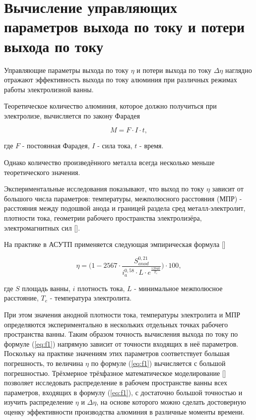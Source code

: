 \documentclass[pdflatex,sn-mathphys-gost]{pmi-jnl}
\begin{document}
\section{Вычисление управляющих параметров выхода по току и потери выхода по току}

Управляющие параметры выхода по току $\eta$ и потери выхода по току $\Delta \eta$ наглядно отражают эффективность выхода по току алюминия при различных режимах работы электролизной ванны.

Теоретическое количество алюминия, которое должно получиться при электролизе, вычисляется по закону Фарадея

\begin{equation}\label{eq:farad}
	M = F \cdot I \cdot t,
\end{equation}

где $F$ - постоянная Фарадея, $I$ - сила тока, $t$ - время.

Однако количество произведённого металла всегда несколько меньше теоретического значения.

Экспериментальные исследования показывают, что выход по току $\eta$ зависит от большого числа параметров: температуры, межполюсного расстояния (МПР) - расстояния между подошвой анода и границей раздела сред металл-электролит, плотности тока, геометрии рабочего пространства электролизёра, электромагнитных сил [\cite{litlink:belo}].

На практике в АСУТП применяется следующая эмпирическая формула [\cite{litlink:VAMI}]

\begin{equation}\label{eq:f1}
	\eta = \bigg(1-2567 \cdot \frac{S^{0,21}_{anod}}{i^{0,58}_{a}\cdot L \cdot e^{\frac{12940}{T_e}}}\bigg) \cdot 100,
\end{equation}

где $S$ площадь ванны, $i$ плотность тока, $L$ - минимальное межполюсное расстояние, $T_e$ - температура электролита.

При этом значения анодной плотности тока, температуры электролита и МПР определяются экспериментально в нескольких отдельных точках рабочего пространства ванны.
Таким образом точность вычисления выхода по току по формуле (\ref{eq:f1}) напрямую зависит от точности входящих в неё параметров. Поскольку на практике значениям этих параметров соответствует большая погрешность, то величина $\eta$ по формуле (\ref{eq:f1}) вычисляется с большой погрешностью. Трёхмерное трёхфазное математическое моделирование [\cite{litlink:kalmykov}] позволяет исследовать распределение в рабочем пространстве ванны всех параметров, входящих в формулу (\ref{eq:f1}), с достаточно большой точностью и изучить распределение $\eta$ и $\Delta\eta$, на основе которого можно сделать достоверную оценку эффективности производства алюминия в различные моменты времени.
\end{document}
